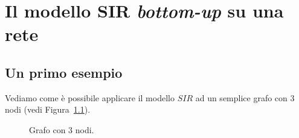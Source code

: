 \chapter{Il modello SIR \textit{bottom-up} su una rete}
\section{Un primo esempio}
Vediamo come \`e possibile applicare il modello $SIR$ ad un semplice grafo con 3 nodi (vedi Figura~\ref{fig::3nodi}).\\
\begin{figure}[ht]
\centering
{}	
\caption{Grafo con 3 nodi.}
\label{fig::3nodi}
\end{figure}

